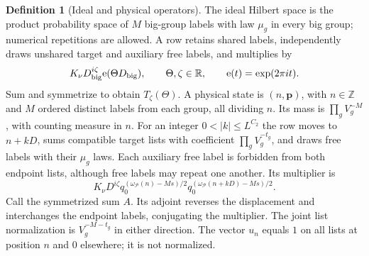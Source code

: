 \documentclass[11pt]{article}
\theoremstyle{definition}
\newtheorem{definition}[theorem]{Definition}
\newcommand{\e}{\mathrm e}
\newcommand{\Z}{\mathbb Z}
\newcommand{\R}{\mathbb R}
\newcommand{\Pset}{\mathcal P}
\theoremstyle{remark}
\begin{document}
\begin{definition}[Ideal and physical operators]\label{def:operators}
The ideal Hilbert space is the product probability space of $M$
big-group labels with law $\mu_g$ in every big group; numerical
repetitions are allowed. A row retains shared labels, independently
draws unshared target and auxiliary free labels, and multiplies by
\begin{equation}\label{eq:ideal-multiplier}
K_\nu D_{\rm big}^{i\zeta}\e(\Theta D_{\rm big}),
\qquad \Theta,\zeta\in\R,\qquad \e(t)=\exp(2\pi it).
\end{equation}
Sum and symmetrize to obtain $T_\zeta(\Theta)$.
A physical state is $(n,\mathbf p)$, with $n\in\Z$ and $M$ ordered
distinct labels from each group, all dividing $n$. Its mass is
$\prod_g V_g^{-M}$, with counting measure in $n$.
For an integer $0<|k|\le L^{C_2}$ the row moves to $n+kD$,
sums compatible target lists with coefficient $\prod_gV_g^{-t_g}$,
and draws free labels with their $\mu_g$ laws. Each auxiliary free
label is forbidden from both endpoint lists, although free labels may
repeat one another. Its multiplier is
\begin{equation}\label{eq:physical-multiplier}
K_\nu D^{i\zeta}
q_0^{(\omega_{\Pset}(n)-Ms)/2}
q_0^{(\omega_{\Pset}(n+kD)-Ms)/2}.
\end{equation}
Call the symmetrized sum $A$.
Its adjoint reverses the displacement and interchanges the endpoint
labels, conjugating the multiplier. The joint list normalization is
$V_g^{-M-t_g}$ in either direction.
The vector $u_n$ equals $1$ on all lists at position $n$ and $0$
elsewhere; it is not normalized.
\end{definition}
\end{document}
